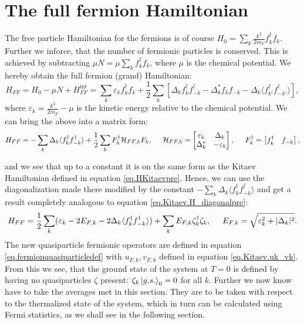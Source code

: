 \section{The full fermion Hamiltonian} \label{sec.HFFfull}
The free particle Hamiltonian for the fermions is of course $H_0 = \sum_k \frac{k^2}{2m_F} f^\dagger_k f_k$. Further we inforce, that the number of fermionic particles is conserved. This is achieved by subtracting $\mu N = \mu \sum_k f^\dagger_k f_k$, where $\mu$ is the chemical potential. We hereby obtain the full fermion (grand) Hamiltonian:
\begin{equation}
H_{FF} = H_0-\mu N + H^\text{int}_{FF} = \sum_k \varepsilon_k f^\dagger_k f_k + \frac{1}{2}\sum_{k} \left[ \Delta_k f^\dagger_k f^\dagger_{-k} - \Delta^*_k f_k f_{-k} - \Delta_k \langle f^\dagger_{k'}f^\dagger_{-k'} \rangle \right], 
\label{eq.HFFdef}
\end{equation} 
where $\varepsilon_k = \frac{k^2}{2m_F}-\mu$ is the kinetic energy relative to the chemical potential. We can bring the above into a matrix form:
\begin{equation}
H_{FF} = -\sum_k \Delta_k\langle f^\dagger_k f^\dagger_{-k}\rangle + \frac{1}{2}\sum_{k} F_k^\dagger \mathcal{H}_{FF,k} F_k, \hspace{0.5cm} \mathcal{H}_{FF,k} = \begin{bmatrix} \varepsilon_k & \Delta_k \\ \Delta^*_k & -\varepsilon_k \end{bmatrix}, \hspace{0.5cm} F^\dagger_k = \begin{bmatrix} f_k^\dagger & f_{-k} \end{bmatrix}, 
\end{equation}

and we see that up to a constant it is on the same form as the Kitaev Hamiltonian defined in equation \eqref{eq.HKitaevpre}. Hence, we can use the diagonalization made there modified by the constant $-\sum_k \Delta_k\langle f^\dagger_k f^\dagger_{-k}\rangle $ and get a result completely analogous to equation \eqref{eq.Kitaev.H_diagonalpre}: 
\begin{equation}
H_{FF} = \frac{1}{2}\sum_k (\varepsilon_k-2E_{F,k}-2\Delta_k\langle f^\dagger_k f^\dagger_{-k}\rangle) + \sum_k E_{F,k} \zeta^\dagger_k \zeta_k, \hspace{0.5cm} E_{F,k} = \sqrt{\varepsilon_k^2 + |\Delta_k|^2}.
\label{eq.Kitaev.HFF_diagonal}
\end{equation}
The new quasiparticle fermionic operators are defined in equation \eqref{eq.fermionquasiparticledef} with $u_{F,k},v_{F,k}$ defined in equation \eqref{eq.Kitaev.uk_vk}. From this we see, that the ground state of the system at $T=0$ is defined by having no quasiparticles $\zeta$ present: $\zeta_k \ket{g.s.}_0 = 0$ for all $k$. Further we now know have to take the averages met in this section. They are to be taken with respect to the thermalized state of the system, which in turn can be calculated using Fermi statistics, as we shall see in the following section. 

